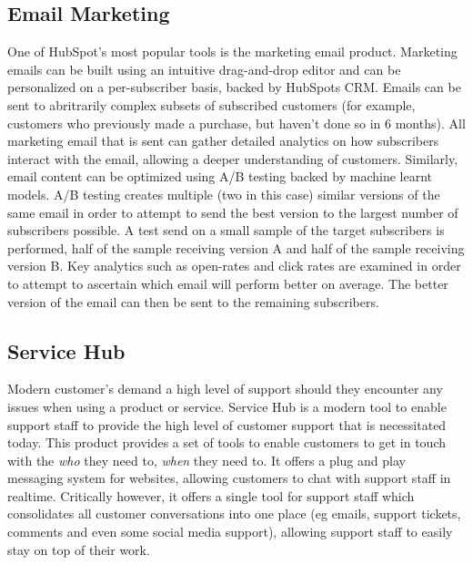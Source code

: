 \subsection{Email Marketing}
One of HubSpot's most popular tools is the marketing email product. Marketing emails can be built using an intuitive drag-and-drop editor and can be personalized on a per-subscriber basis, backed by HubSpots CRM. Emails can be sent to abritrarily complex subsets of subscribed customers (for example, customers who previously made a purchase, but haven't done so in 6 months). All marketing email that is sent can gather detailed analytics on how subscribers interact with the email, allowing a deeper understanding of customers. Similarly, email content can be optimized using A/B testing backed by machine learnt models. A/B testing creates multiple (two in this case) similar versions of the same email in order to attempt to send the best version to the largest number of subscribers possible. A test send on a small sample of the target subscribers is performed, half of the sample receiving version A and half of the sample receiving version B. Key analytics such as open-rates and click rates are examined in order to attempt to ascertain which email will perform better on average. The better version of the email can then be sent to the remaining subscribers.

\subsection{Service Hub}
Modern customer's demand a high level of support should they encounter any issues when using a product or service. Service Hub is a modern tool to enable support staff to provide the high level of customer support that is necessitated today. This product provides a set of tools to enable customers to get in touch with the \textit{who} they need to, \textit{when} they need to. It offers a plug and play messaging system for websites, allowing customers to chat with support staff in realtime. Critically however, it offers a single tool for support staff which consolidates all customer conversations into one place (eg emails, support tickets, comments and even some social media support), allowing support staff to easily stay on top of their work. 


